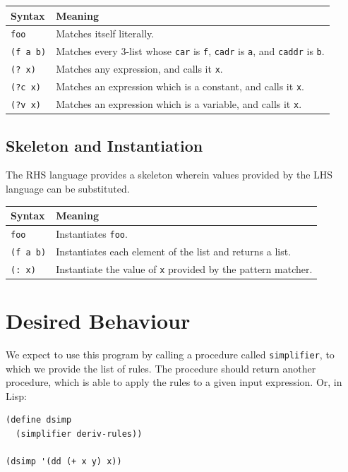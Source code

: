 \documentclass[9pt]{report}
\begin{document}
\begin{center}
\begin{tabular}{ll}
\toprule
Syntax & Meaning\\
\midrule
\texttt{foo} & Matches itself literally.\\
\texttt{(f a b)} & Matches every 3-list whose \texttt{car} is \texttt{f}, \texttt{cadr} is \texttt{a}, and \texttt{caddr} is \texttt{b}.\\
\texttt{(? x)} & Matches any expression, and calls it \texttt{x}.\\
\texttt{(?c x)} & Matches an expression which is a constant, and calls it \texttt{x}.\\
\texttt{(?v x)} & Matches an expression which is a variable, and calls it \texttt{x}.\\
\bottomrule
\end{tabular}
\end{center}


\subsection{Skeleton and Instantiation}
\label{sec:orge319ba7}
The RHS language provides a skeleton wherein values provided by
the LHS language can be substituted.

\begin{center}
\begin{tabular}{ll}
\toprule
Syntax & Meaning\\
\midrule
\texttt{foo} & Instantiates \texttt{foo}.\\
\texttt{(f a b)} & Instantiates each element of the list and returns a list.\\
\texttt{(: x)} & Instantiate the value of \texttt{x} provided by the pattern matcher.\\
\bottomrule
\end{tabular}
\end{center}

\section{Desired Behaviour}
\label{sec:org0d1558e}

We expect to use this program by calling a procedure called
\texttt{simplifier}, to which we provide the list of rules. The procedure
should return another procedure, which is able to apply the rules
to a given input expression. Or, in Lisp:

\begin{verbatim}
(define dsimp
  (simplifier deriv-rules))

(dsimp '(dd (+ x y) x))
\end{verbatim}
\end{document}
